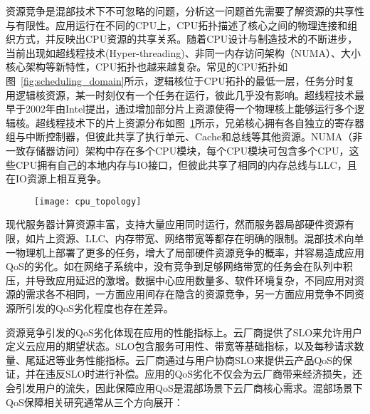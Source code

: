 资源竞争是混部技术下不可忽略的问题，分析这一问题首先需要了解资源的共享性与有限性。应用运行在不同的CPU上，CPU拓扑描述了核心之间的物理连接和组织方式，并反映出CPU资源的共享关系。随着CPU设计与制造技术的不断进步，当前出现如超线程技术(Hyper-threading)、非同一内存访问架构（NUMA）、大小核心架构等新特性，CPU拓扑也越来越复杂。常见的CPU拓扑如图~\ref{fig:scheduling_domain}所示，逻辑核位于CPU拓扑的最低一层，任务分时复用逻辑核资源，某一时刻仅有一个任务在运行，彼此几乎没有影响。超线程技术最早于2002年由Intel提出，通过增加部分片上资源使得一个物理核上能够运行多个逻辑核。超线程技术下的片上资源分布如图~\ref{fig:cpu_topology}所示，兄弟核心拥有各自独立的寄存器组与中断控制器，但彼此共享了执行单元、Cache和总线等其他资源。NUMA（非一致存储器访问）架构中存在多个CPU模块，每个CPU模块可包含多个CPU，这些CPU拥有自己的本地内存与IO接口，但彼此共享了相同的内存总线与LLC，且在IO资源上相互竞争。

\begin{figure}[!htbp]
    \centering
    \texttt{[image: cpu\_topology]}
    \label{fig:cpu_topology}
\end{figure}

现代服务器计算资源丰富，支持大量应用同时运行，然而服务器局部硬件资源有限，如片上资源、LLC、内存带宽、网络带宽等都存在明确的限制。混部技术向单一物理机上部署了更多的任务，增大了局部硬件资源竞争的概率，并容易造成应用QoS的劣化。如在网络子系统中，没有竞争到足够网络带宽的任务会在队列中积压，并导致应用延迟的激增。数据中心应用数量多、软件环境复杂，不同应用对资源的需求各不相同，一方面应用间存在隐含的资源竞争，另一方面应用竞争不同资源所引发的QoS劣化程度也存在差异。

资源竞争引发的QoS劣化体现在应用的性能指标上。云厂商提供了SLO来允许用户定义云应用的期望状态。SLO包含服务可用性、带宽等基础指标，以及每秒请求数量、尾延迟等业务性能指标。云厂商通过与用户协商SLO来提供云产品QoS的保证，并在违反SLO时进行补偿。应用的QoS劣化不仅会为云厂商带来经济损失，还会引发用户的流失，因此保障应用QoS是混部场景下云厂商核心需求。混部场景下QoS保障相关研究通常从三个方向展开：

